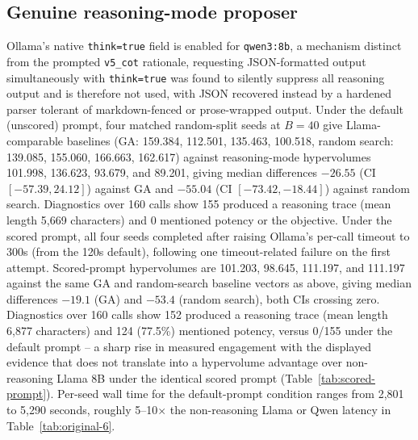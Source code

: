 \subsection{Genuine reasoning-mode proposer}
\label{app:reasoning}
Ollama's native \texttt{think=true} field is enabled for \texttt{qwen3:8b}, a mechanism distinct from the prompted \texttt{v5\_cot} rationale, requesting JSON-formatted output simultaneously with \texttt{think=true} was found to silently suppress all reasoning output and is therefore not used, with JSON recovered instead by a hardened parser tolerant of markdown-fenced or prose-wrapped output. Under the default (unscored) prompt, four matched random-split seeds at $B=40$ give Llama-comparable baselines (GA: 159.384, 112.501, 135.463, 100.518, random search: 139.085, 155.060, 166.663, 162.617) against reasoning-mode hypervolumes 101.998, 136.623, 93.679, and 89.201, giving median differences $-26.55$ (CI $[-57.39,24.12]$) against GA and $-55.04$ (CI $[-73.42,-18.44]$) against random search. Diagnostics over 160 calls show 155 produced a reasoning trace (mean length 5,669 characters) and 0 mentioned potency or the objective. Under the scored prompt, all four seeds completed after raising Ollama's per-call timeout to 300s (from the 120s default), following one timeout-related failure on the first attempt. Scored-prompt hypervolumes are 101.203, 98.645, 111.197, and 111.197 against the same GA and random-search baseline vectors as above, giving median differences $-19.1$ (GA) and $-53.4$ (random search), both CIs crossing zero. Diagnostics over 160 calls show 152 produced a reasoning trace (mean length 6,877 characters) and 124 (77.5\%) mentioned potency, versus 0/155 under the default prompt -- a sharp rise in measured engagement with the displayed evidence that does not translate into a hypervolume advantage over non-reasoning Llama 8B under the identical scored prompt (Table~\ref{tab:scored-prompt}). Per-seed wall time for the default-prompt condition ranges from 2,801 to 5,290 seconds, roughly 5--10$\times$ the non-reasoning Llama or Qwen latency in Table~\ref{tab:original-6}.

